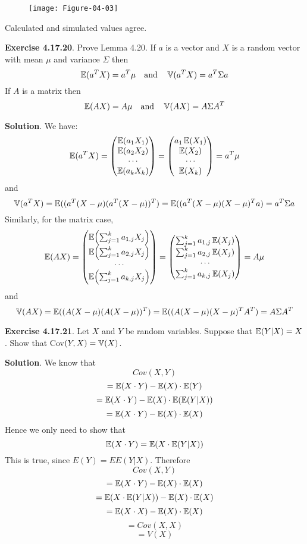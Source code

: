 \begin{figure}[H]
\centering
\texttt{[image: Figure-04-03]}
\end{figure}

Calculated and simulated values agree.

\textbf{Exercise 4.17.20}. Prove Lemma 4.20.
If \(a\) is a vector and \(X\) is a random vector with mean \(\mu\) and
variance \(\Sigma\) then
\[
\operatorname{\mathbb{E}}(a^T X) = a^T \mu
\quad \text{and} \quad
\operatorname{\mathbb{V}}(a^T X) = a^T \Sigma a
\]
If \(A\) is a matrix then
\[
\operatorname{\mathbb{E}}(A X) = A \mu
\quad \text{and} \quad
\operatorname{\mathbb{V}}(AX) = A \Sigma A^T
\]

\textbf{Solution}.
We have:
\[
\operatorname{\mathbb{E}}(a^T X) = \begin{pmatrix}
\operatorname{\mathbb{E}}(a_{1} X_{1}) \\
\operatorname{\mathbb{E}}(a_{2} X_{2}) \\
\cdots \\
\operatorname{\mathbb{E}}(a_{k} X_{k})
\end{pmatrix} = \begin{pmatrix}
a_{1} \operatorname{\mathbb{E}}(X_{1}) \\
\operatorname{\mathbb{E}}(X_{2}) \\
\cdots \\
\operatorname{\mathbb{E}}(X_{k})
\end{pmatrix} = a^T \mu
\]
and
\[
\operatorname{\mathbb{V}}(a^T X) = \operatorname{\mathbb{E}}((a^T (X - \mu) (a^T(X - \mu))^T) = \operatorname{\mathbb{E}}((a^T (X - \mu) (X - \mu)^T a) = a^T \Sigma a
\]
Similarly, for the matrix case,
\[
\EXP(AX) = \begin{pmatrix}
\EXP\left( \sum_{j=1}^{k} a_{1, j} X_{j} \right) \\
\EXP\left( \sum_{j=1}^{k} a_{2, j} X_{j} \right) \\
\cdots \\
\EXP\left( \sum_{j=1}^{k} a_{k, j} X_{j} \right) \\
\end{pmatrix} = \begin{pmatrix}
\sum_{j=1}^{k} a_{1, j} \EXP(X_{j}) \\
\sum_{j=1}^{k} a_{2, j} \EXP(X_{j}) \\
\cdots \\
\sum_{j=1}^{k} a_{k, j} \EXP(X_{j}) \\
\end{pmatrix} = A \mu
\]
and
\[
\operatorname{\mathbb{V}}(A X) = \operatorname{\mathbb{E}}((A (X - \mu) (A(X - \mu))^T) = \operatorname{\mathbb{E}}((A (X - \mu) (X - \mu)^T A^T) = A \Sigma A^T
\]

\textbf{Exercise 4.17.21}. Let \(X\) and \(Y\) be random variables.
Suppose that \(\operatorname{\mathbb{E}}(Y|X) = X\). Show that
Cov\((Y, X) = \operatorname{\mathbb{V}}(X)\).

\textbf{Solution}. We know that \[
Cov(X, Y)
\]
\[
= \operatorname{\mathbb{E}}(X \cdot Y) - \operatorname{\mathbb{E}}(X) \cdot \operatorname{\mathbb{E}}(Y)
\]
\[
= \operatorname{\mathbb{E}}(X \cdot Y) - \operatorname{\mathbb{E}}(X) \cdot \operatorname{\mathbb{E}}(\operatorname{\mathbb{E}}(Y|X))
\]
\[
= \operatorname{\mathbb{E}}(X\cdot Y) - \operatorname{\mathbb{E}}(X) \cdot \operatorname{\mathbb{E}}(X)
\]
Hence we only need to show that
\[
\operatorname{\mathbb{E}}(X\cdot Y) = \operatorname{\mathbb{E}}(X \cdot \operatorname{\mathbb{E}}(Y|X))
\]
This is true, since \(E(Y) = EE(Y|X)\). Therefore \[
Cov(X, Y)
\]
\[
= \operatorname{\mathbb{E}}(X\cdot Y) -  \operatorname{\mathbb{E}}(X) \cdot \operatorname{\mathbb{E}}(X)
\]
\[
= \operatorname{\mathbb{E}}(X \cdot \operatorname{\mathbb{E}}(Y|X)) -  \operatorname{\mathbb{E}}(X) \cdot \operatorname{\mathbb{E}}(X)
\]
\[
= \operatorname{\mathbb{E}}(X\cdot X) -  \operatorname{\mathbb{E}}(X) \cdot \operatorname{\mathbb{E}}(X)
\]
\[
= Cov(X, X)
\] \[
= V(X)
\]

